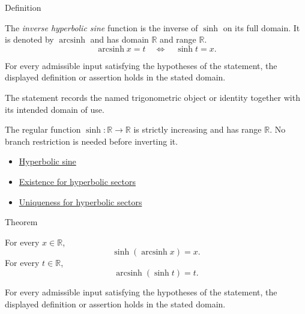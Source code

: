

\begin{definitionbox}{Definition}
\begin{definition}
\label{def:inverse-hyperbolic-sine}
The \emph{inverse hyperbolic sine} function is the inverse of $\sinh$ on
its full domain. It is denoted by $\operatorname{arcsinh}$ and has domain
$\mathbb{R}$ and range $\mathbb{R}$.
\[
  \operatorname{arcsinh} x=t
  \quad\Longleftrightarrow\quad
  \sinh t=x.
\]
\end{definition}
\end{definitionbox}
\begin{remark*}
For every admissible input satisfying the hypotheses of the statement, the
displayed definition or assertion holds in the stated domain.
\end{remark*}

\begin{remark*}[Interpretation]
The statement records the named trigonometric object or identity together with
its intended domain of use.
\end{remark*}

\begin{remark*}
The regular function $\sinh:\mathbb{R}\to\mathbb{R}$ is strictly increasing
and has range $\mathbb{R}$. No branch restriction is needed before inverting
it.
\end{remark*}
\begin{dependencies}
\begin{itemize}
  \item \hyperref[def:hyperbolic-sine]{Hyperbolic sine}
  \item \hyperref[thm:hyperbolic-sector-existence]{Existence for hyperbolic sectors}
  \item \hyperref[thm:hyperbolic-sector-uniqueness]{Uniqueness for hyperbolic sectors}
\end{itemize}
\end{dependencies}

\begin{theorembox}{Theorem}
\begin{theorem}
\label{thm:inverse-hyperbolic-sine-identities}
For every $x\in\mathbb{R}$,
\[
  \sinh(\operatorname{arcsinh} x)=x.
\]
For every $t\in\mathbb{R}$,
\[
  \operatorname{arcsinh}(\sinh t)=t.
\]
\end{theorem}
\end{theorembox}
\begin{remark*}
For every admissible input satisfying the hypotheses of the statement, the
displayed definition or assertion holds in the stated domain.
\end{remark*}

